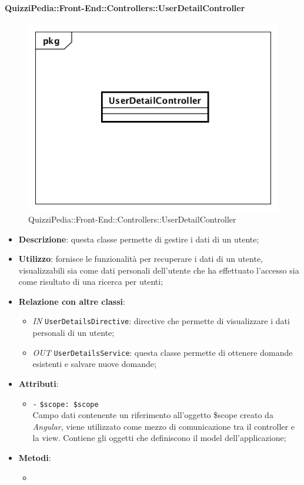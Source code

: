 \paragraph{QuizziPedia::Front-End::Controllers::UserDetailController}
\begin{figure} [ht]
	\centering
	\includegraphics[scale=0.45]{UML/Classi/Front-End/QuizziPedia_Front-end_Controller_UserDetailController.png}
	\caption{QuizziPedia::Front-End::Controllers::UserDetailController}
\end{figure} \FloatBarrier
\begin{itemize}
	\item \textbf{Descrizione}: questa classe permette di gestire i dati di un utente;
	\item \textbf{Utilizzo}: fornisce le funzionalità per recuperare i dati di un utente, visualizzabili sia come dati personali dell'utente che ha effettuato l'accesso sia come risultato di una ricerca per utenti;
	\item \textbf{Relazione con altre classi}:
	\begin{itemize}
		\item \textit{IN} \texttt{UserDetailsDirective}: directive che permette di visualizzare i dati personali di un utente;
		\item \textit{OUT} \texttt{UserDetailsService}: questa classe permette di ottenere domande esistenti e salvare nuove domande;
	\end{itemize}
	\item \textbf{Attributi}:
	\begin{itemize}
		\item \texttt{-} \texttt{\$scope: \$scope} \\
		Campo dati contenente un riferimento all’oggetto \$scope creato da \textit{Angular}, viene utilizzato come mezzo di comunicazione tra il controller e la view. Contiene gli oggetti che definiscono il model dell’applicazione;
	\end{itemize}
	\item \textbf{Metodi}:
	\begin{itemize}
		\item 
	\end{itemize}
\end{itemize}

